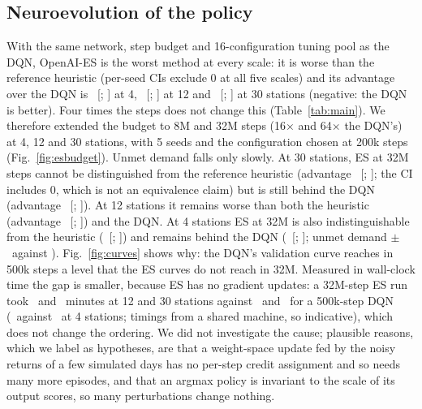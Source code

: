 \documentclass[conference,a4paper]{IEEEtran}
\begin{document}
\subsection{Neuroevolution of the policy}
With the same network, step budget and 16-configuration tuning pool as the DQN, OpenAI-ES is the worst method at every scale: it is worse than the reference heuristic
(per-seed CIs exclude 0 at all five scales) and its advantage over the DQN is \cecCEsVsDqnA\ [\cecCEsVsDqnLoA; \cecCEsVsDqnHiA] at 4, \cecCEsVsDqnC\ [\cecCEsVsDqnLoC;
\cecCEsVsDqnHiC] at 12 and \cecCEsVsDqnE\ [\cecCEsVsDqnLoE; \cecCEsVsDqnHiE] at 30 stations (negative: the DQN is better). Four times the steps does not change this
(Table~\ref{tab:main}). We therefore extended the budget to 8M and 32M steps (16$\times$ and 64$\times$ the DQN's) at 4, 12 and 30 stations, with 5 seeds and the
configuration chosen at 200k steps (Fig.~\ref{fig:esbudget}). Unmet demand falls only slowly. At 30 stations, ES at 32M steps cannot be distinguished from the reference
heuristic (advantage \cecBudThirtytwoHE\ [\cecBudThirtytwoHLoE; \cecBudThirtytwoHHiE]; the CI includes 0, which is not an equivalence claim) but is still behind the DQN
(advantage \cecBudThirtytwoVsE\ [\cecBudThirtytwoVsLoE; \cecBudThirtytwoVsHiE]). At 12 stations it remains worse than both the heuristic (advantage \cecBudThirtytwoHC\
[\cecBudThirtytwoHLoC; \cecBudThirtytwoHHiC]) and the DQN. At 4 stations ES at 32M is also indistinguishable from the heuristic (\cecBudThirtytwoHA\ [\cecBudThirtytwoHLoA; \cecBudThirtytwoHHiA]) and remains behind the DQN
(\cecBudThirtytwoVsA\ [\cecBudThirtytwoVsLoA; \cecBudThirtytwoVsHiA]; unmet demand \cecBudThirtytwoA$\pm$\cecBudThirtytwoHwA\ against \cecBudDqnA).
Fig.~\ref{fig:curves} shows why: the DQN's validation curve reaches in 500k steps a level that the ES curves do not reach in 32M. Measured in wall-clock time the gap is smaller,
because ES has no gradient updates: a 32M-step ES run took \cecTimeThirtytwoC\ and \cecTimeThirtytwoE\ minutes at 12 and 30 stations against \cecTimeDqnC\ and \cecTimeDqnE\ for a
500k-step DQN (\cecTimeThirtytwoA\ against \cecTimeDqnA\ at 4 stations; timings from a shared machine, so indicative), which does not change the ordering.
We did not investigate the cause; plausible reasons, which we label as hypotheses, are that a weight-space update fed by the noisy returns of a few simulated days has no
per-step credit assignment and so needs many more episodes, and that an argmax policy is invariant to the scale of its output scores, so many perturbations change nothing.
\end{document}
